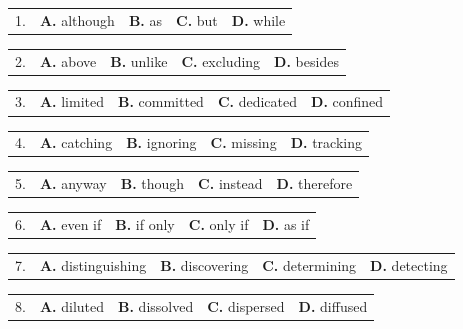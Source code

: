 \documentclass[UTF8,11pt]{ctexart}
\begin{document}
\noindent\begin{tabularx}{\linewidth}{@{}lXXXX@{}}1. & \textbf{A.} although & \textbf{B.} as & \textbf{C.} but & \textbf{D.} while\\\end{tabularx}\par

\noindent\begin{tabularx}{\linewidth}{@{}lXXXX@{}}2. & \textbf{A.} above & \textbf{B.} unlike & \textbf{C.} excluding & \textbf{D.} besides\\\end{tabularx}\par

\noindent\begin{tabularx}{\linewidth}{@{}lXXXX@{}}3. & \textbf{A.} limited & \textbf{B.} committed & \textbf{C.} dedicated & \textbf{D.} confined\\\end{tabularx}\par

\noindent\begin{tabularx}{\linewidth}{@{}lXXXX@{}}4. & \textbf{A.} catching & \textbf{B.} ignoring & \textbf{C.} missing & \textbf{D.} tracking\\\end{tabularx}\par

\noindent\begin{tabularx}{\linewidth}{@{}lXXXX@{}}5. & \textbf{A.} anyway & \textbf{B.} though & \textbf{C.} instead & \textbf{D.} therefore\\\end{tabularx}\par

\noindent\begin{tabularx}{\linewidth}{@{}lXXXX@{}}6. & \textbf{A.} even if & \textbf{B.} if only & \textbf{C.} only if & \textbf{D.} as if\\\end{tabularx}\par

\noindent\begin{tabularx}{\linewidth}{@{}lXXXX@{}}7. & \textbf{A.} distinguishing & \textbf{B.} discovering & \textbf{C.} determining & \textbf{D.} detecting\\\end{tabularx}\par

\noindent\begin{tabularx}{\linewidth}{@{}lXXXX@{}}8. & \textbf{A.} diluted & \textbf{B.} dissolved & \textbf{C.} dispersed & \textbf{D.} diffused\\\end{tabularx}\par
\end{document}
